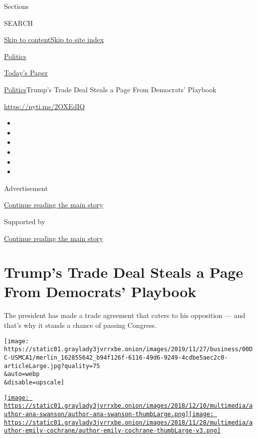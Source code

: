 Sections

SEARCH

\protect\hyperlink{site-content}{Skip to
content}\protect\hyperlink{site-index}{Skip to site index}

\href{https://www.nytimes3xbfgragh.onion/section/politics}{Politics}

\href{https://myaccount.nytimes3xbfgragh.onion/auth/login?response_type=cookie\&client_id=vi}{}

\href{https://www.nytimes3xbfgragh.onion/section/todayspaper}{Today's
Paper}

\href{/section/politics}{Politics}\textbar{}Trump's Trade Deal Steals a
Page From Democrats' Playbook

\url{https://nyti.ms/2OXEdIQ}

\begin{itemize}
\item
\item
\item
\item
\item
\item
\end{itemize}

Advertisement

\protect\hyperlink{after-top}{Continue reading the main story}

Supported by

\protect\hyperlink{after-sponsor}{Continue reading the main story}

\hypertarget{trumps-trade-deal-steals-a-page-from-democrats-playbook}{%
\section{Trump's Trade Deal Steals a Page From Democrats'
Playbook}\label{trumps-trade-deal-steals-a-page-from-democrats-playbook}}

The president has made a trade agreement that caters to his opposition
--- and that's why it stands a chance of passing Congress.

\texttt{[image: https://static01.graylady3jvrrxbe.onion/images/2019/11/27/business/00DC-USMCA1/merlin\_162855642\_b94f126f-6116-49d6-9249-4cdbe5aec2c0-articleLarge.jpg?quality=75\\\&auto=webp\\\&disable=upscale]}

\href{https://www.nytimes3xbfgragh.onion/by/ana-swanson}{\texttt{[image: https://static01.graylady3jvrrxbe.onion/images/2018/12/10/multimedia/author-ana-swanson/author-ana-swanson-thumbLarge.png]}}\href{https://www.nytimes3xbfgragh.onion/by/emily-cochrane}{\texttt{[image: https://static01.graylady3jvrrxbe.onion/images/2018/11/28/multimedia/author-emily-cochrane/author-emily-cochrane-thumbLarge-v3.png]}}

